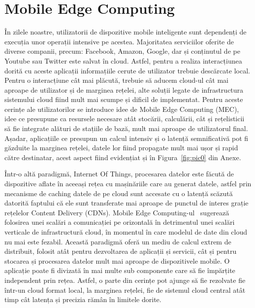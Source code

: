 \documentclass[12pt,a4paper]{report}
\begin{document}
\section{Mobile Edge Computing} \label{mobileEdgeComputing}
În zilele noastre, utilizatorii de dispozitive mobile inteligente sunt dependenți de execuția unor operații intensive pe acestea. Majoritatea serviciilor oferite de diverse companii, precum: Facebook, Amazon, Google, dar și conținutul de pe Youtube sau Twitter este salvat în cloud. Astfel, pentru a realiza interacțiunea dorită cu aceste aplicații informațiile cerute de utilizator trebuie descărcate local. Pentru o interacțiune cât mai plăcută, trebuie să aducem cloud-ul cât mai aproape de utilizator și de marginea rețelei, alte soluții legate de infrastructura sistemului cloud fiind mult mai scumpe și dificil de implementat. Pentru aceste cerințe ale utilizatorilor se introduce idee de Mobile Edge Computing (MEC), idee ce presupune ca resursele necesare atât stocării, calculării, cât și rețelisticii să fie integrate alături de stațiile de bază, mult mai aproape de utilizatorul final. Așadar, aplicațiile ce presupun un calcul intensiv și o latență semnificativă pot fi găzduite la marginea rețelei, datele lor fiind propagate mult mai ușor și rapid către destinatar, acest aspect fiind evidențiat și în Figura~\ref{fig:pic0} din Anexe.

Într-o altă paradigmă, Internet Of Things, procesarea datelor este făcută de dispozitive aflate în aceeași rețea cu mașinăriile care au generat datele, astfel prin mecanisme de caching datele de pe cloud sunt accesate cu o latență scăzută datorită faptului că ele sunt transferate mai aproape de punctul de interes grație rețelelor Content Delivery (CDNs). Mobile Edge Computing-ul~\cite{MecSurvey} sugerează folosirea unei scalări a comunicației pe orizontală în detrimentul unei scalări verticale de infrastructură cloud, în momentul în care modelul de date din cloud nu mai este fezabil. Această paradigmă oferă un mediu de calcul extrem de distribuit, folosit atât pentru dezvoltarea de aplicații și servicii, cât și pentru stocarea și procesarea datelor mult mai aproape de dispozitivele mobile. O aplicație poate fi divizată în mai multe sub componente care să fie împărțite independent prin rețea. Astfel, o parte din cerințe pot ajunge să fie rezolvate fie într-un cloud format local, la marginea rețelei, fie de sistemul cloud central atât timp cât latența și precizia rămân în limitele dorite.
\end{document}

